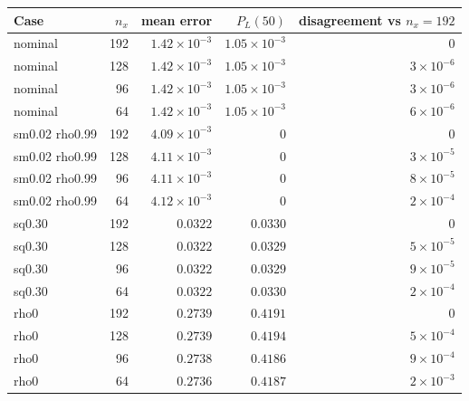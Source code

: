 \begin{tabular}{lrrrr}
\toprule
Case & $n_x$ & mean error & $P_L(50)$ & disagreement vs $n_x{=}192$ \\
\midrule
nominal & 192 & $1.42\!\times\!10^{-3}$ & $1.05\!\times\!10^{-3}$ & $0$ \\
nominal & 128 & $1.42\!\times\!10^{-3}$ & $1.05\!\times\!10^{-3}$ & $3\!\times\!10^{-6}$ \\
nominal & 96 & $1.42\!\times\!10^{-3}$ & $1.05\!\times\!10^{-3}$ & $3\!\times\!10^{-6}$ \\
nominal & 64 & $1.42\!\times\!10^{-3}$ & $1.05\!\times\!10^{-3}$ & $6\!\times\!10^{-6}$ \\
sm0.02 rho0.99 & 192 & $4.09\!\times\!10^{-3}$ & $0$ & $0$ \\
sm0.02 rho0.99 & 128 & $4.11\!\times\!10^{-3}$ & $0$ & $3\!\times\!10^{-5}$ \\
sm0.02 rho0.99 & 96 & $4.11\!\times\!10^{-3}$ & $0$ & $8\!\times\!10^{-5}$ \\
sm0.02 rho0.99 & 64 & $4.12\!\times\!10^{-3}$ & $0$ & $2\!\times\!10^{-4}$ \\
sq0.30 & 192 & $0.0322$ & $0.0330$ & $0$ \\
sq0.30 & 128 & $0.0322$ & $0.0329$ & $5\!\times\!10^{-5}$ \\
sq0.30 & 96 & $0.0322$ & $0.0329$ & $9\!\times\!10^{-5}$ \\
sq0.30 & 64 & $0.0322$ & $0.0330$ & $2\!\times\!10^{-4}$ \\
rho0 & 192 & $0.2739$ & $0.4191$ & $0$ \\
rho0 & 128 & $0.2739$ & $0.4194$ & $5\!\times\!10^{-4}$ \\
rho0 & 96 & $0.2738$ & $0.4186$ & $9\!\times\!10^{-4}$ \\
rho0 & 64 & $0.2736$ & $0.4187$ & $2\!\times\!10^{-3}$ \\
\bottomrule
\end{tabular}
